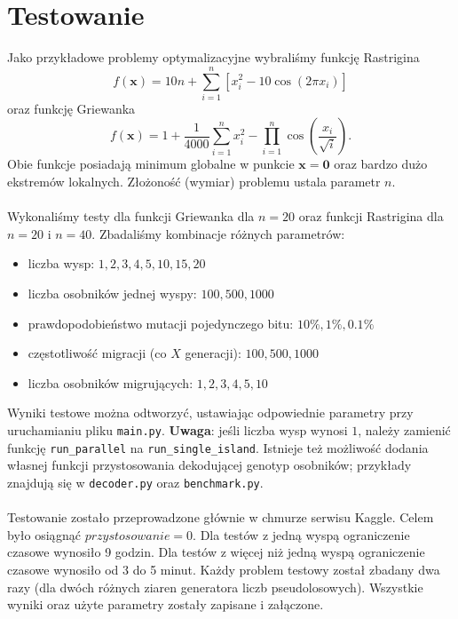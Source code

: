 \documentclass[12pt,a4paper]{article}
\begin{document}
\section*{Testowanie}
Jako przykładowe problemy optymalizacyjne wybraliśmy funkcję Rastrigina
\[ f(\mathbf{x})=10n+\sum_{i=1}^{n}\left[x_i^2-10\cos(2\pi x_i)\right] \]
oraz funkcję Griewanka
\[ f(\mathbf{x})=1+\frac{1}{4000}\sum_{i=1}^{n}x_i^2-\prod_{i=1}^{n}\cos\left(\frac{x_i}{\sqrt{i}}\right). \] Obie funkcje posiadają minimum globalne w punkcie $\mathbf{x=0}$ oraz bardzo dużo ekstremów lokalnych. Złożoność (wymiar) problemu ustala parametr $n$.
\\
\\
Wykonaliśmy testy dla funkcji Griewanka dla $n=20$ oraz funkcji Rastrigina dla $n=20$ i $n=40$. Zbadaliśmy kombinacje różnych parametrów:
\begin{itemize}
	\item liczba wysp: $1,2,3,4,5,10,15,20$
	\item liczba osobników jednej wyspy: $100,500,1000$
	\item prawdopodobieństwo mutacji pojedynczego bitu: $10\%,1\%,0.1\%$
	\item częstotliwość migracji (co $X$ generacji): $100,500,1000$
	\item liczba osobników migrujących: $1,2,3,4,5,10$
\end{itemize}
Wyniki testowe można odtworzyć, ustawiając odpowiednie parametry przy uruchamianiu pliku \texttt{main.py}. \textbf{Uwaga}: jeśli liczba wysp wynosi $1$, należy zamienić funkcję \texttt{run\_parallel} na \texttt{run\_single\_island}. Istnieje też możliwość dodania własnej funkcji przystosowania dekodującej genotyp osobników; przykłady znajdują się w \texttt{decoder.py} oraz \texttt{benchmark.py}.
\\
\\
Testowanie zostało przeprowadzone głównie w chmurze serwisu Kaggle. Celem było osiągnąć $przystosowanie=0$. Dla testów z jedną wyspą ograniczenie czasowe wynosiło 9 godzin. Dla testów z więcej niż jedną wyspą ograniczenie czasowe wynosiło od 3 do 5 minut. Każdy problem testowy został zbadany dwa razy (dla dwóch różnych ziaren generatora liczb pseudolosowych). Wszystkie wyniki oraz użyte parametry zostały zapisane i załączone.
\end{document}
